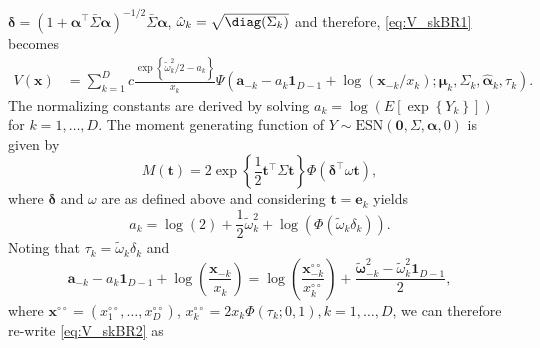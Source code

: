 \documentclass[12pt]{article}
\begin{document}
$\bm \delta = \left( 1 + \bm \alpha^\top \bar{\Sigma} \bm \alpha\right)^{-1/2}\bar{\Sigma} \bm \alpha$, 
$\hat{\omega}_k = \sqrt{\diag(\Sigma_k)}$
and therefore, \eqref{eq:V_skBR1} becomes
%
\begin{align}
\label{eq:V_skBR2}
V(\bm x) &= \sum_{k=1}^D c \frac{\exp\left\{\tilde{\omega}_k^2/2-a_k\right\}}{x_k}
\Psi \left( \bm a_{-k}-a_{k} \bm 1_{D-1}+\log(\bm x_{-k}/x_k) ; \bm \mu_k, \Sigma_k, \hat{\bm \alpha}_k, \tau_k\right).
\end{align}
% 
The normalizing constants are derived by solving $a_k = \log\left( E \left[ \exp \left\{ Y_k\right\}\right]\right)$ for $k=1, \ldots, D$. The moment generating function of $Y \sim \text{ESN}(\bm 0, \Sigma, \bm \alpha, 0)$ is given by
%
$$
M(\bm t)  = 2 \exp \left\{ \frac{1}{2} \bm t^\top \Sigma \bm t \right\} \Phi\left( \bm \delta^\top \omega \bm t\right),
$$
%
where $\bm \delta$ and $\omega$ are as defined above and considering $\bm t = \bm e_k$ yields 
%
$$
a_k = \log(2) + \frac{1}{2} \tilde{\omega}_k^2 + \log \left( \Phi\left( \tilde{\omega}_{k} \delta_k \right)\right).
$$
Noting that $\tau_k = \tilde{\omega}_k \delta_k$ and
%
$$
\bm a_{-k}-a_{k} \bm 1_{D-1}+\log \left(\frac{\bm x_{-k}}{x_k}\right)
= \log \left( \frac{\bm x^{\circ\circ}_{-k}}{x^{\circ\circ}_k} \right) + \frac{\tilde{\bm \omega}_{-k}^2 - \tilde{\omega}_k^2\bm 1_{D-1}}{2},
$$
where $\bm x^{\circ\circ} = \left( x^{\circ\circ}_1, \ldots, x^{\circ\circ}_D\right)$, $x^{\circ\circ}_k = 2x_k \Phi\left( \tau_k; 0, 1 \right), k=1, \ldots, D$,
we can therefore re-write \eqref{eq:V_skBR2} as
%
\end{document}
